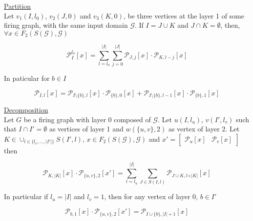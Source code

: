 \documentclass[a4paper, 11pt]{article}
\begin{document}
\underline{Partition}\\

Let $v_1(I, l_0)$, $v_2(J, 0)$ and $v_3(K, 0)$, be three vertices at the layer 1 of some firing graph, with the same input domain $\mathcal{G}$. If $I = J \cup K$ and $J \cap K = \emptyset$, then, $\forall x \in F_2(S(\mathcal{G}), \mathcal{G})$

\begin{equation}
\label{prop:partition-1}
\mathcal{P}_I^{l_0}\left[ x \right] = \sum_{l=l_0}^{\vert I \vert} \sum_{j=0}^{\vert J \vert} \mathcal{P}_{J, j}\left[ x \right]  \cdot \mathcal{P}_{K, l - j}\left[ x \right] 
\end{equation} 

In paticular for $b \in I$

\begin{equation}
\label{prop:partition-2}
\mathcal{P}_{I, l}\left[ x \right] = \mathcal{P}_{I\setminus \{ b\}, l}\left[ x \right] \cdot \mathcal{P}_{\{ b\}, 0}\left[ x \right] + \mathcal{P}_{I\setminus \{ b\}, l-1}\left[ x \right] \cdot \mathcal{P}_{\{ b\}, 1}\left[ x \right]
\end{equation} 

\underline{Decomposition}\\

Let $G$ be a firing graph with layer 0 composed of $\mathcal{G}$. Let $u(I, l_u)$, $v(I', l_v)$ such that $I \cap I' = \emptyset$ as vertices of layer 1 and $w(\{ u, v \}, 2)$ as vertex of layer 2. Let $K \in \cup_{l \in \{l_v, \ldots, \vert I' \vert \}} S(I', l)$, $x \in F_2(S(\mathcal{G}), \mathcal{G})$ and $x' = \begin{bmatrix} \mathcal{P}_{u}[x] &\mathcal{P}_{v}[x] \end{bmatrix}$ then 


\begin{equation}
\label{prop:2layer-1}
\mathcal{P}_{K, \vert K \vert}\left[ x \right] \cdot \mathcal{P}_{\{u, v\}, 2}\left[ x' \right] = \sum_{l=l_u}^{\vert I \vert}  \sum_{J \in S(I, l)} \mathcal{P}_{J \cup K, l + \vert K \vert }\left[ x \right]
\end{equation}

In particular if $l_u = \vert I \vert$ and $l_v = 1$, then for any vertex of layer 0, $b \in I'$

\begin{equation}
\label{prop:2layer-2}
 \mathcal{P}_{b, 1}\left[ x \right] \cdot \mathcal{P}_{\{u, v\}, 2} \left[ x' \right]= \mathcal{P}_{I \cup \{b\}, \vert I \vert + 1}\left[ x \right]
\end{equation}
\end{document}
